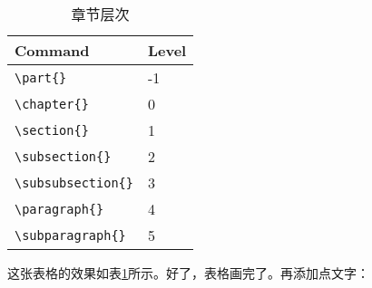 \begin{table}
  \begin{singlespace}
    \centering\caption{章节层次}\label{tab:level}
    \begin{tabular}{ll}\hline
      Command & Level \\ \hline
      \verb|\part{}| & -1 \\
      \verb|\chapter{}| & 0 \\
      \verb|\section{}| & 1 \\
      \verb|\subsection{}| & 2 \\
      \verb|\subsubsection{}| & 3 \\
      \verb|\paragraph{}| & 4 \\
      \verb|\subparagraph{}| & 5 \\ \hline
    \end{tabular}
  \end{singlespace}
\end{table}

这张表格的效果如表\ref{tab:level}所示。好了，表格画完了。再添加点文字：

